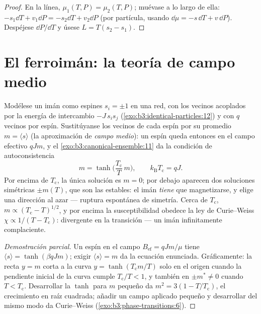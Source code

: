 \begin{proof}
En la línea, $\mu_1(T, P) = \mu_2(T, P)$; muévase a lo largo de ella:
$-s_1\dd T + v_1\dd P = -s_2\dd T + v_2\dd P$ (por partícula, usando
$\dd\mu = -s\,\dd T + v\,\dd P$). Despéjese $\dd P/\dd T$ y úsese
$L = T(s_2 - s_1)$.
\end{proof}

\section{El ferroimán: la teoría de campo medio}

\begin{theorem}\label{thm:b3:phase-transitions:meanfield}
Modélese un imán como espines $s_i = \pm1$ en una red, con los vecinos
acoplados por la energía de intercambio $-J\,s_is_j$
(\cref{exo:b3:identical-particles:12}) y con $q$ vecinos por
espín. Sustitúyanse los vecinos de cada espín por su promedio $m =
\langle s\rangle$ (la aproximación de \emph{campo medio}): un espín
queda entonces en el campo efectivo $qJm$, y el
\cref{exo:b3:canonical-ensemble:11} da la condición de
autoconsistencia
\[
m = \tanh\!\Big(\frac{T_{\text{c}}}{T}\,m\Big) , \qquad
k_{\text{B}}T_{\text{c}} = qJ .
\]
Por encima de $T_{\text{c}}$, la única solución es $m = 0$; por debajo aparecen dos
soluciones simétricas $\pm m(T)$, que son las estables: el
imán \emph{tiene} que magnetizarse, y elige una dirección al azar ---
ruptura espontánea de simetría. Cerca de $T_{\text{c}}$, $m \propto
(T_{\text{c}} - T)^{1/2}$, y por encima la susceptibilidad obedece
la ley de Curie--Weiss $\chi \propto 1/(T - T_{\text{c}})$:
divergente en la transición --- un imán infinitamente complaciente.
\end{theorem}

\begin{proof}[Demostración parcial]
Un espín en el campo $B_{\text{ef}} = qJm/\mu$ tiene $\langle s\rangle =
\tanh(\beta qJm)$; exigir $\langle s\rangle = m$ da la
ecuación enunciada. Gráficamente: la recta $y = m$ corta a la curva $y =
\tanh(T_{\text{c}}m/T)$ solo en el origen cuando la pendiente inicial de la curva
cumple $T_{\text{c}}/T < 1$, y también en $\pm m^* \neq 0$ cuando
$T < T_{\text{c}}$. Desarrollar la $\tanh$ para $m$ pequeño
da $m^2 = 3(1 - T/T_{\text{c}})$, el crecimiento en raíz cuadrada;
añadir un campo aplicado pequeño y desarrollar del mismo modo da
Curie--Weiss (\cref{exo:b3:phase-transitions:6}).
\end{proof}

